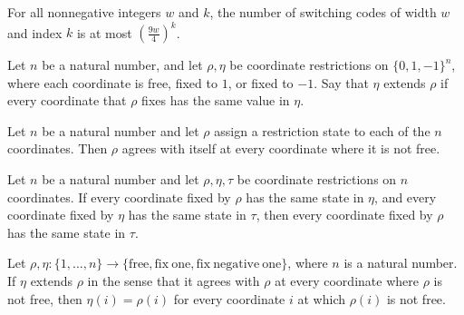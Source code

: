 \begin{theorem}
\label{FABL.SwitchingCode.card_le_scale_pow}
\leanok
{}
For all nonnegative integers $w$ and $k$, the number of switching codes of width $w$ and
index $k$ is at most $\left(\frac{9w}{4}\right)^k$.
\end{theorem}

\begin{definition}
\label{FABL.CoordRestriction.Extends}
\leanok
{}
Let $n$ be a natural number, and let $\rho,\eta$ be coordinate restrictions on
$\{0,1,-1\}^n$, where each coordinate is free, fixed to $1$, or fixed to $-1$. Say that
$\eta$ extends $\rho$ if every coordinate that $\rho$ fixes has the same value in
$\eta$.
\end{definition}

\begin{theorem}
\label{FABL.CoordRestriction.extends_refl}
\leanok
{}
Let $n$ be a natural number and let $\rho$ assign a restriction state to each of the $n$
coordinates. Then $\rho$ agrees with itself at every coordinate where it is not free.
\end{theorem}

\begin{theorem}
\label{FABL.CoordRestriction.Extends.trans}
\leanok
{}
Let $n$ be a natural number and let $\rho,\eta,\tau$ be coordinate restrictions on $n$
coordinates. If every coordinate fixed by $\rho$ has the same state in $\eta$, and every
coordinate fixed by $\eta$ has the same state in $\tau$, then every coordinate fixed by
$\rho$ has the same state in $\tau$.
\end{theorem}

\begin{theorem}
\label{FABL.CoordRestriction.Extends.eq_of_ne_free}
\leanok
{}
Let $\rho,\eta:\{1,\ldots,n\}\to\{\mathrm{free},\mathrm{fix\ one},\mathrm{fix\ negative\
one}\}$, where $n$ is a natural number. If $\eta$ extends $\rho$ in the sense that it
agrees with $\rho$ at every coordinate where $\rho$ is not free, then $\eta(i)=\rho(i)$
for every coordinate $i$ at which $\rho(i)$ is not free.
\end{theorem}

